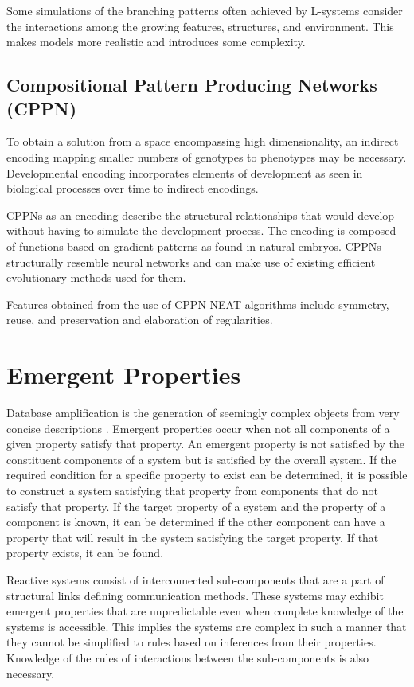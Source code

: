 Some simulations of the branching patterns often achieved by L-systems consider the interactions among the growing features, structures, and environment. This makes models more realistic and introduces some complexity. \citep{Prusinkiewicz2004}

\subsection{Compositional Pattern Producing Networks (CPPN)}

To obtain a solution from a space encompassing high dimensionality, an indirect encoding mapping smaller numbers of genotypes to phenotypes may be necessary. Developmental encoding incorporates elements of development as seen in biological processes over time to indirect encodings. \citep{Hornby2001}

CPPNs as an encoding describe the structural relationships that would develop without having to simulate the development process. The encoding is composed of functions based on gradient patterns as found in natural embryos. CPPNs structurally resemble neural networks and can make use of existing efficient evolutionary methods used for them. \citep{Stanley2006}

Features obtained from the use of CPPN-NEAT algorithms include symmetry, reuse, and preservation and elaboration of regularities. \citep{Stanley2006}

\section{Emergent Properties}

Database amplification is the generation of seemingly complex objects from very concise descriptions \citep{Prusinkiewicz2004}. Emergent properties occur when not all components of a given property satisfy that property. An emergent property is not satisfied by the constituent components of a system but is satisfied by the overall system. If the required condition for a specific property to exist can be determined, it is possible to construct a system satisfying that property from components that do not satisfy that property. If the target property of a system and the property of a component is known, it can be determined if the other component can have a property that will result in the system satisfying the target property. If that property exists, it can be found. \citep{Zakinthinos1998}

Reactive systems consist of interconnected sub-components that are a part of structural links defining communication methods. These systems may exhibit emergent properties that are unpredictable even when complete knowledge of the systems is accessible. This implies the systems are complex in such a manner that they cannot be simplified to rules based on inferences from their properties. Knowledge of the rules of interactions between the sub-components is also necessary. \citep{Aiguier2008}

